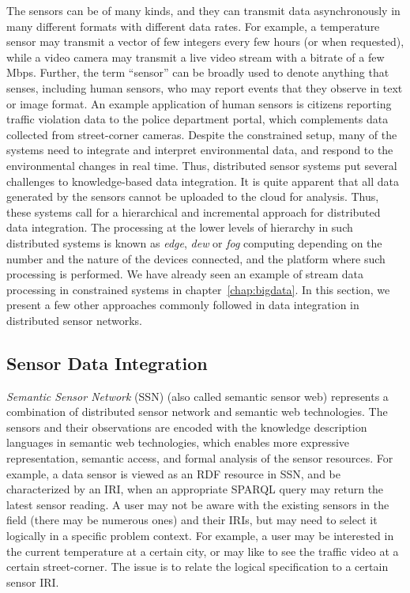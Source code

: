 The sensors can be of many kinds, and they can transmit data asynchronously in many different formats with different data rates. 
For example, a temperature sensor may transmit a vector of few integers every few hours (or when requested), while a video camera 
may transmit a live video stream with a bitrate of a few Mbps. Further, the term ``sensor'' can be broadly used to denote anything 
that senses, including human sensors, who may report events that they observe in text or image format. An example application
of human sensors is citizens reporting traffic violation data to the police department portal, which complements data collected
from street-corner cameras. 
%
  
Despite the constrained setup, many of the systems need to integrate and interpret environmental data, and respond to the
environmental changes in real time. Thus, distributed sensor systems put several challenges to knowledge-based data integration. 
It is quite apparent that all data generated by the sensors cannot be uploaded to the cloud for analysis. Thus, these systems 
call for a hierarchical and incremental approach for distributed data integration. The processing at the lower levels of hierarchy 
in such distributed systems is known as {\em edge}, {\em dew} or {\em fog} computing depending on the number and the nature of 
the devices connected, and the platform where such processing is performed. We have already seen an example of stream data 
processing in constrained systems in chapter~\ref{chap:bigdata}. In this section, we present a few other approaches commonly 
followed in data integration in distributed sensor networks.

\subsection{Sensor Data Integration}

 
 
{\em Semantic Sensor Network} (SSN) (also called semantic sensor web) represents a combination of distributed sensor network and 
semantic web technologies. The sensors and their observations are encoded with the knowledge description languages in semantic web 
technologies, which enables more expressive representation, semantic access, and formal analysis of the sensor resources. For 
example, a data sensor is viewed as an RDF resource in SSN, and be characterized by an IRI, when an appropriate SPARQL query may 
return the latest sensor reading. A user may not be aware with the existing sensors in the field (there may be numerous ones) and
their IRIs, but may need to select it logically in a specific problem context. For example, a user may be interested in the current 
temperature at a certain city, or may like to see the traffic video at a certain street-corner. The issue is to relate the logical 
specification to a certain sensor IRI.

